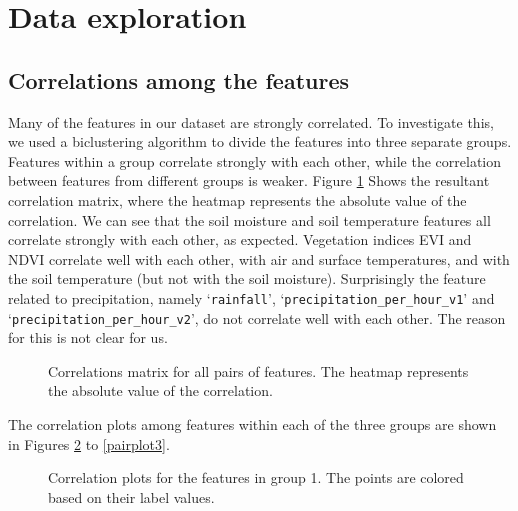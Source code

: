 \documentclass[10pt,parskip=half,
toc=sectionentrywithdots,
bibliography=totocnumbered,
captions=tableheading,numbers=noendperiod]{scrartcl}
\begin{document}
\hypertarget{data-exploration}{%
\section{Data exploration}\label{data-exploration}}

\hypertarget{correlations-among-the-features}{%
\subsection{Correlations among the
features}\label{correlations-among-the-features}}

Many of the features in our dataset are strongly correlated. To
investigate this, we used a biclustering algorithm to divide the
features into three separate groups. Features within a group correlate
strongly with each other, while the correlation between features from
different groups is weaker. Figure \ref{corr_mat} Shows the resultant
correlation matrix, where the heatmap represents the absolute value of
the correlation. We can see that the soil moisture and soil temperature
features all correlate strongly with each other, as expected. Vegetation
indices EVI and NDVI correlate well with each other, with air and
surface temperatures, and with the soil temperature (but not with the
soil moisture). Surprisingly the feature related to precipitation,
namely `\texttt{rainfall}', `\texttt{precipitation\_per\_hour\_v1}' and
`\texttt{precipitation\_per\_hour\_v2}', do not correlate well with each
other. The reason for this is not clear for us.

\begin{figure}[H]\begin{center}\end{center}\caption{Correlations matrix for all pairs of features. The heatmap represents
the absolute value of the correlation.}\label{corr_mat}\end{figure}

The correlation plots among features within each of the three groups are
shown in Figures \ref{pairplot1} to \ref{pairplot3}.

\begin{figure}[H]\begin{center}\end{center}\caption{Correlation plots for the features in group 1. The points are colored
based on their label values.}\label{pairplot1}\end{figure}
\end{document}
